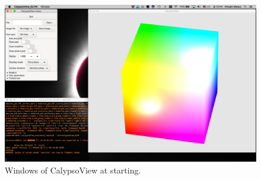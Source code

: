 %
\begin{figure}[htbp]
\begin{center}
\includegraphics*[width=120mm]{images/Desktop_1}
\end{center}
\caption{Windows of CalypsoView at starting.}
\label{fig:start_linux}
\end{figure}
%



